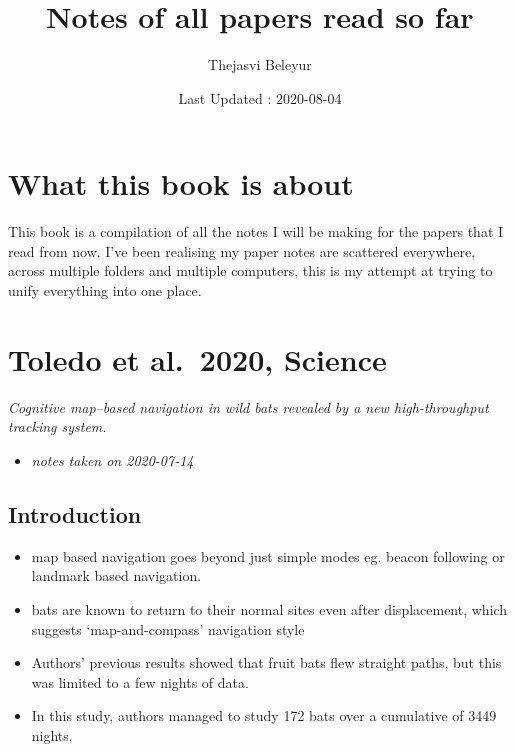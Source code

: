\documentclass[
]{book}
\title{Notes of all papers read so far}
\author{Thejasvi Beleyur}
\date{Last Updated : 2020-08-04}
\providecommand{\tightlist}{%
  \setlength{\itemsep}{0pt}\setlength{\parskip}{0pt}}
\begin{document}
\maketitle

{
\setcounter{tocdepth}{1}
\tableofcontents
}
\hypertarget{what-this-book-is-about}{%
\chapter*{What this book is about}\label{what-this-book-is-about}}

This book is a compilation of all the notes I will be making for the papers that I read from now.
I've been realising my paper notes are scattered everywhere, across multiple folders and multiple computers,
this is my attempt at trying to unify everything into one place.

\hypertarget{toledo-et-al.-2020-science}{%
\chapter{Toledo et al.~2020, Science}\label{toledo-et-al.-2020-science}}


\emph{Cognitive map--based navigation in wild bats revealed by a new high-throughput tracking system.} \citep{toledo2020cognitive}

\begin{itemize}
\tightlist
\item
  \emph{notes taken on 2020-07-14}
\end{itemize}

\hypertarget{introduction}{%
\section{Introduction}\label{introduction}}

\begin{itemize}
\tightlist
\item
  map based navigation goes beyond just simple modes eg. beacon following or landmark based navigation.
\item
  bats are known to return to their normal sites even after displacement, which suggests `map-and-compass' navigation style
\item
  Authors' previous results showed that fruit bats flew straight paths, but this was limited to a few nights of data.
\item
  In this study, authors managed to study 172 bats over a cumulative of 3449 nights.
\end{itemize}
\end{document}
